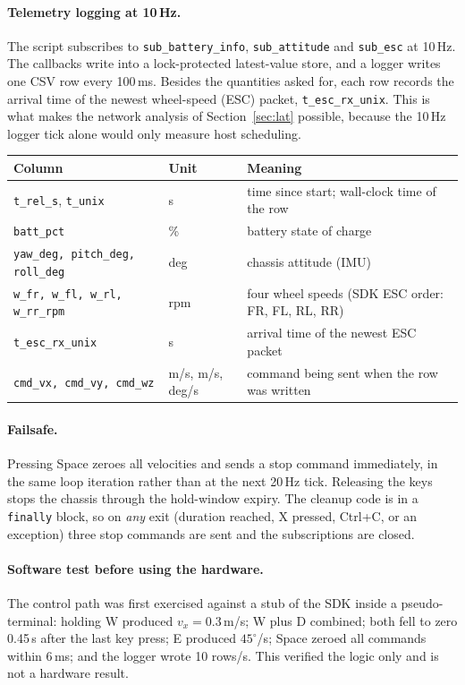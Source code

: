 \documentclass[11pt,a4paper]{article}
\begin{document}
\paragraph{Telemetry logging at 10\,Hz.} The script subscribes to \texttt{sub\_battery\_info}, \texttt{sub\_attitude} and \texttt{sub\_esc} at 10\,Hz. The callbacks write into a lock-protected latest-value store, and a logger writes one CSV row every 100\,ms. Besides the quantities asked for, each row records the arrival time of the newest wheel-speed (ESC) packet, \texttt{t\_esc\_rx\_unix}. This is what makes the network analysis of Section~\ref{sec:lat} possible, because the 10\,Hz logger tick alone would only measure host scheduling.

\begin{center}\small
\begin{tabular}{@{}ll>{\raggedright\arraybackslash}p{8.2cm}@{}}
\toprule
\textbf{Column} & \textbf{Unit} & \textbf{Meaning}\\
\midrule
\texttt{t\_rel\_s}, \texttt{t\_unix} & s & time since start; wall-clock time of the row\\
\texttt{batt\_pct} & \% & battery state of charge\\
\texttt{yaw\_deg, pitch\_deg, roll\_deg} & deg & chassis attitude (IMU)\\
\texttt{w\_fr, w\_fl, w\_rl, w\_rr\_rpm} & rpm & four wheel speeds (SDK ESC order: FR, FL, RL, RR)\\
\texttt{t\_esc\_rx\_unix} & s & arrival time of the newest ESC packet\\
\texttt{cmd\_vx, cmd\_vy, cmd\_wz} & m/s, m/s, deg/s & command being sent when the row was written\\
\bottomrule
\end{tabular}
\end{center}

\paragraph{Failsafe.} Pressing Space zeroes all velocities and sends a stop command immediately, in the same loop iteration rather than at the next 20\,Hz tick. Releasing the keys stops the chassis through the hold-window expiry. The cleanup code is in a \texttt{finally} block, so on \emph{any} exit (duration reached, X pressed, Ctrl+C, or an exception) three stop commands are sent and the subscriptions are closed.

\paragraph{Software test before using the hardware.} The control path was first exercised against a stub of the SDK inside a pseudo-terminal: holding W produced $v_x=0.3$\,m/s; W plus D combined; both fell to zero 0.45\,s after the last key press; E produced $45^\circ$/s; Space zeroed all commands within 6\,ms; and the logger wrote 10 rows/s. This verified the logic only and is not a hardware result.
\end{document}
